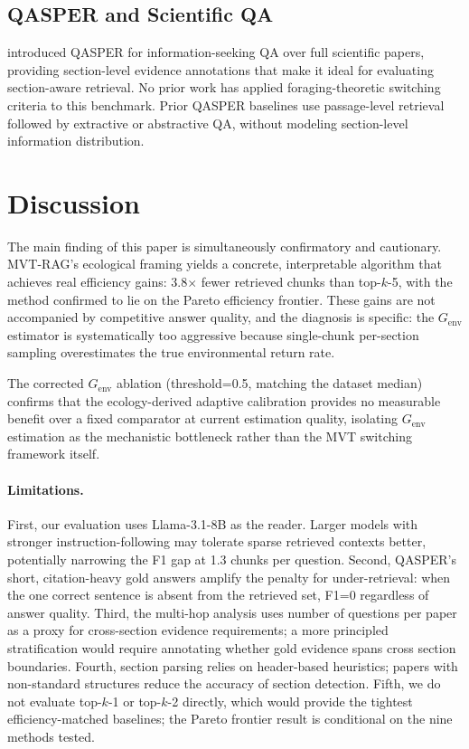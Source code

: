 \documentclass[11pt,letterpaper]{article}
\begin{document}
\subsection{QASPER and Scientific QA}

\citet{Dasigi2021} introduced QASPER for information-seeking QA over full scientific papers, providing section-level
evidence annotations that make it ideal for evaluating section-aware retrieval. No prior work has applied
foraging-theoretic switching criteria to this benchmark. Prior QASPER baselines use passage-level retrieval followed
by extractive or abstractive QA, without modeling section-level information distribution.

\section{Discussion}

The main finding of this paper is simultaneously confirmatory and cautionary. MVT-RAG's ecological framing yields a
concrete, interpretable algorithm that achieves real efficiency gains: 3.8$\times$ fewer retrieved chunks than
top-$k$-5, with the method confirmed to lie on the Pareto efficiency frontier. These gains are not accompanied by
competitive answer quality, and the diagnosis is specific: the $G_{\mathrm{env}}$ estimator is systematically too
aggressive because single-chunk per-section sampling overestimates the true environmental return rate.

The corrected $G_{\mathrm{env}}$ ablation (threshold=0.5, matching the dataset median) confirms that the
ecology-derived adaptive calibration provides no measurable benefit over a fixed comparator at current estimation
quality, isolating $G_{\mathrm{env}}$ estimation as the mechanistic bottleneck rather than the MVT switching framework
itself.

\paragraph{Limitations.} First, our evaluation uses Llama-3.1-8B as the reader. Larger models with stronger
instruction-following may tolerate sparse retrieved contexts better, potentially narrowing the F1 gap at 1.3 chunks per
question. Second, QASPER's short, citation-heavy gold answers amplify the penalty for under-retrieval: when the one
correct sentence is absent from the retrieved set, F1=0 regardless of answer quality. Third, the multi-hop analysis
uses number of questions per paper as a proxy for cross-section evidence requirements; a more principled
stratification would require annotating whether gold evidence spans cross section boundaries. Fourth, section parsing
relies on header-based heuristics; papers with non-standard structures reduce the accuracy of section detection.
Fifth, we do not evaluate top-$k$-1 or top-$k$-2 directly, which would provide the tightest efficiency-matched
baselines; the Pareto frontier result is conditional on the nine methods tested.
\end{document}
